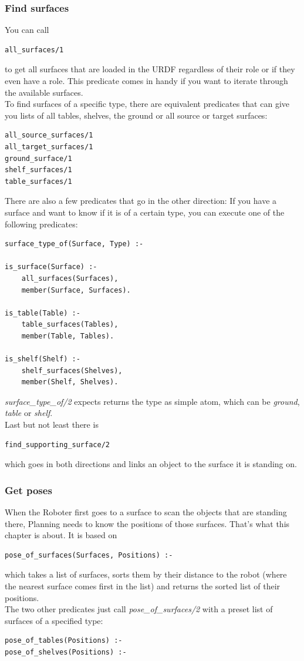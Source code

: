 \documentclass[main.tex]{subfiles}
\begin{document}
\subsubsection{Find surfaces}

You can call
\begin{lstlisting}
all_surfaces/1
\end{lstlisting}
to get all surfaces that are loaded in the URDF regardless of their role or if they even have a role. This predicate comes in handy if you want to iterate through the available surfaces.\\
To find surfaces of a specific type, there are equivalent predicates that can give you lists of all tables, shelves, the ground or all source or target surfaces:
\begin{lstlisting}
all_source_surfaces/1
all_target_surfaces/1
ground_surface/1
shelf_surfaces/1
table_surfaces/1
\end{lstlisting}

There are also a few predicates that go in the other direction: If you have a surface and want to know if it is of a certain type, you can execute one of the following predicates:
\begin{lstlisting}
surface_type_of(Surface, Type) :-

is_surface(Surface) :-
    all_surfaces(Surfaces),
    member(Surface, Surfaces).

is_table(Table) :-
    table_surfaces(Tables),
    member(Table, Tables).

is_shelf(Shelf) :-
    shelf_surfaces(Shelves),
    member(Shelf, Shelves).
\end{lstlisting}
\textit{surface\_type\_of/2} expects returns the type as simple atom, which can be \textit{ground}, \textit{table} or \textit{shelf}.\\
Last but not least there is 
\begin{lstlisting}
find_supporting_surface/2
\end{lstlisting}
which goes in both directions and links an object to the surface it is standing on.

\subsubsection{Get poses}
When the Roboter first goes to a surface to scan the objects that are standing there, Planning needs to know the positions of those surfaces. That's what this chapter is about. It is based on
\begin{lstlisting}
pose_of_surfaces(Surfaces, Positions) :-
\end{lstlisting}
which takes a list of surfaces, sorts them by their distance to the robot (where the nearest surface comes first in the list) and returns the sorted list of their positions.\\
The two other predicates just call \textit{pose\_of\_surfaces/2} with a preset list of surfaces of a specified type:
\begin{lstlisting}
pose_of_tables(Positions) :-
pose_of_shelves(Positions) :-
\end{lstlisting}
\end{document}
